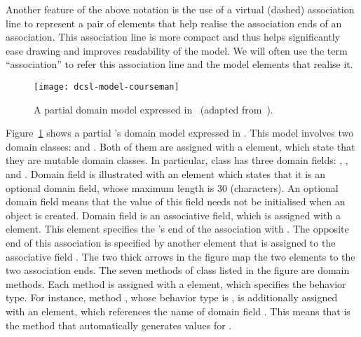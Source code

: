 Another feature of the above notation is the use of a virtual (dashed) association line to represent a pair of  elements that help realise the association ends of an association. This association line is more compact and thus helps significantly ease drawing and improves readability of the model. 
We will often use the term ``association'' to refer this association line and the  model elements that realise it.

\begin{figure}[ht]
	\centering
	\texttt{[image: dcsl-model-courseman]}
	\caption{A partial \courseman domain model expressed in \dcsl~(adapted from~\cite{le_domain_2018}).}
	\label{fig:dcsl_courseman}
\end{figure}

Figure~\ref{fig:dcsl_courseman} shows a partial \courseman's domain model expressed in \dcsl. This model involves two domain classes:  and . 
Both of them are assigned with a  element, which state that they are mutable domain classes. In particular, class  has three domain fields: , , and . Domain field  is illustrated with an  element which states that it is an optional domain field, whose maximum length is 30 (characters). An optional domain field means that the value of this field needs not be initialised when an object is created. Domain field  is an associative field, which is assigned with a  element. This element specifies the 's end of the association with . The opposite end of this association is specified by another  element that is assigned to the associative field . The two thick arrows in the figure map the two  elements to the two association ends. 
%
The seven methods of class  listed in the figure are domain methods. Each method is assigned with a  element, which specifies the behavior type. For instance, method , whose behavior type is , is additionally assigned with an  element, which references the name of domain field . This means that  is the method that automatically generates values for .

